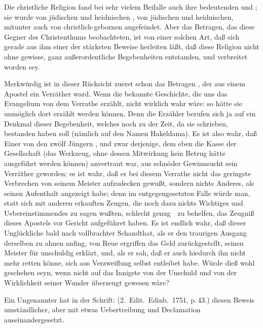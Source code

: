 Die christliche Religion fand bei sehr vielem Beifalle auch ihre bedeutenden  und ; sie wurde von jüdischen und heidnischen , von jüdischen und heidnischen, mitunter auch von christlich-gebornen  angefeindet. Aber das Betragen, das diese Gegner des Christenthums beobachteten, ist von einer solchen Art, daß sich gerade aus ihm einer der stärksten Beweise herleiten läßt, daß diese Religion nicht ohne gewisse, ganz außerordentliche Begebenheiten entstanden, und verbreitet worden sey.
\begin{aufza}
\item Merkwürdig ist in dieser Rücksicht zuerst schon das Betragen , der aus einem Apostel ein Verräther ward. Wenn die bekannte Geschichte, die uns das Evangelium von dem Verrathe  erzählt, nicht wirklich wahr wäre: so hätte sie unmöglich dort erzählt werden können. Denn die Erzähler berufen sich ja auf ein Denkmal dieser Begebenheit, welches noch zu der Zeit, da sie schrieben, bestanden haben soll (nämlich auf den Namen Hakeldama). Es ist also wahr, daß Einer von den zwölf Jüngern , und zwar derjenige, dem eben die Kasse der Gesellschaft (das Werkzeug, ohne dessen Mitwirkung kein Betrug hätte ausgeführt werden können) anvertraut war, aus schnöder Gewinnsucht sein Verräther geworden; es ist wahr, daß er bei diesem Verrathe nicht das geringste Verbrechen von seinem Meister aufzudecken gewußt, sondern nichts Anderes, als seinen Aufenthalt angezeigt habe; denn im entgegengesetzten Falle würde man, statt sich mit anderen erkauften Zeugen, die noch dazu nichts Wichtiges und Uebereinstimmendes zu sagen wußten, schlecht genug~\ zu behelfen, das Zeugniß dieses Apostels vor Gericht aufgeführet haben. Es ist endlich wahr, daß dieser Unglückliche bald nach vollbrachter Schandthat, als er den traurigen Ausgang derselben zu ahnen anfing, von Reue ergriffen das Geld zurückgestellt, seinen Meister für unschuldig erklärt, und, als er sah, daß er auch hiedurch ihn nicht mehr retten könne, sich aus Verzweiflung selbst entleibet habe. Würde dieß wohl geschehen seyn, wenn  nicht auf das Innigste von der Unschuld  und von der Wirklichkeit seiner Wunder überzeugt gewesen wäre?


\begin{RWanm} Ein Ungenannter hat in der Schrift:  (2.~Edit.\ Edinb.\ 1751, p.\,43.) diesen Beweis umständlicher, aber mit etwas Uebertreibung und Declamation auseinandergesetzt. \end{RWanm}


\end{aufza}
